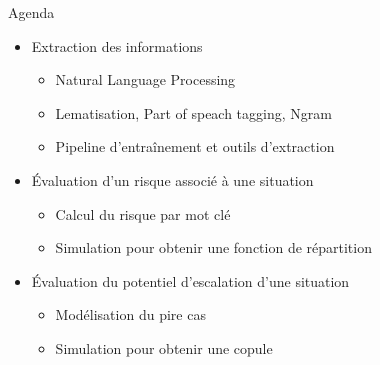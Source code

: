 \begin{frame}[label=intro]{Agenda}
	\begin{itemize}
		\item Extraction des informations
		\begin{itemize}
			\item Natural Language Processing
			\item Lematisation, Part of speach tagging, Ngram 
			\item Pipeline d'entraînement et outils d'extraction
		\end{itemize}
		\item Évaluation d'un risque associé à une situation
		\begin{itemize}
			\item Calcul du risque par mot clé
			\item Simulation pour obtenir une fonction de répartition
		\end{itemize}
		
		\item Évaluation du potentiel d'escalation d'une situation
			\begin{itemize}
				\item Modélisation du pire cas
				\item Simulation pour obtenir une copule 
			\end{itemize}
	\end{itemize}
\end{frame}








